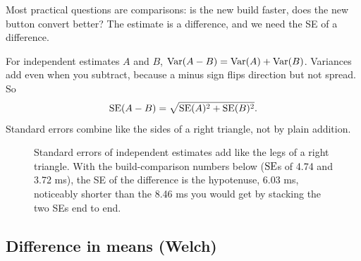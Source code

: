 Most practical questions are comparisons: is the new build faster, does the
new button convert better? The estimate is a difference, and we need the SE
of a difference.

\begin{whybox}
For independent estimates $A$ and $B$,
$\operatorname{Var}(A - B) = \operatorname{Var}(A) + \operatorname{Var}(B)$. Variances add even when you subtract,
because a minus sign flips direction but not spread. So
\[
  \operatorname{SE}(A - B) = \sqrt{\operatorname{SE}(A)^2 + \operatorname{SE}(B)^2}.
\]
Standard errors combine like the sides of a right triangle, not by plain
addition.
\end{whybox}

\begin{figure}[H]
\centering
{}
\caption{Standard errors of independent estimates add like the legs of a right
triangle. With the build-comparison numbers below ($\operatorname{SE}$s of 4.74 and
3.72 ms), the SE of the difference is the hypotenuse, 6.03 ms, noticeably
shorter than the 8.46 ms you would get by stacking the two SEs end to end.}
\label{fig:ci-se-triangle}
\end{figure}

\subsection{Difference in means (Welch)}

